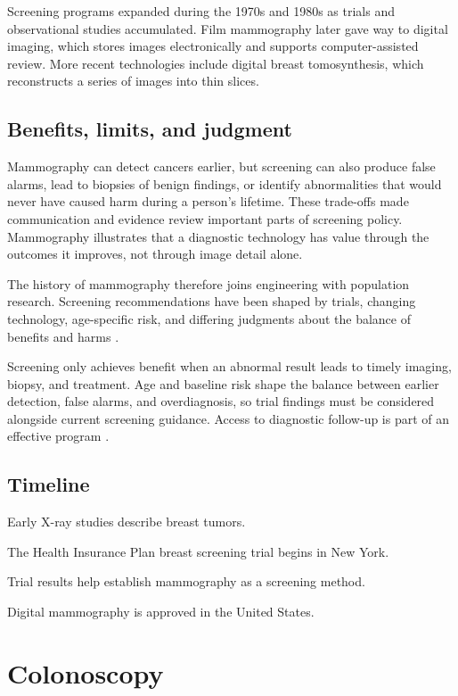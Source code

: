 \documentclass[12pt,oneside]{book}
\begin{document}
Screening programs expanded during the 1970s and 1980s as trials and
observational studies accumulated. Film mammography later gave way to digital
imaging, which stores images electronically and supports computer-assisted
review. More recent technologies include digital breast tomosynthesis, which
reconstructs a series of images into thin slices.

\section{Benefits, limits, and judgment}
Mammography can detect cancers earlier, but screening can also produce false alarms, lead to biopsies of benign findings, or identify abnormalities that would never have caused harm during a person's lifetime. These trade-offs made communication and evidence review important parts of screening policy. Mammography illustrates that a diagnostic technology has value through the outcomes it improves, not through image detail alone.

The history of mammography therefore joins engineering with population
research. Screening recommendations have been shaped by trials, changing
technology, age-specific risk, and differing judgments about the balance of
benefits and harms \cite{nciBreastScreening}.

Screening only achieves benefit when an abnormal result leads to timely
imaging, biopsy, and treatment. Age and baseline risk shape the balance
between earlier detection, false alarms, and overdiagnosis, so trial findings
must be considered alongside current screening guidance. Access to diagnostic
follow-up is part of an effective program
\cite{hipMammographyTrial,nciBreastScreening}.

\section*{Timeline}
\begin{description}[leftmargin=2.3cm,style=nextline]
  \item[1910s] Early X-ray studies describe breast tumors.
  \item[1963] The Health Insurance Plan breast screening trial begins in New York.
  \item[1970s] Trial results help establish mammography as a screening method.
  \item[2000] Digital mammography is approved in the United States.
\end{description}
\chapter[Colonoscopy]{Colonoscopy}
\end{document}
